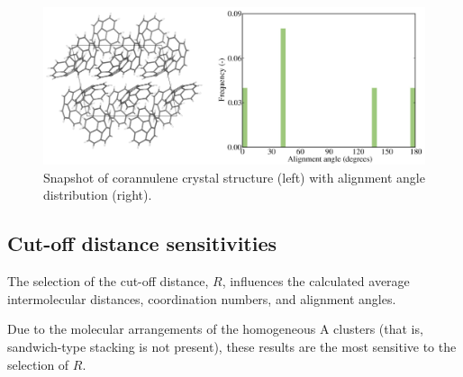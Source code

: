 %
\begin{figure}[!tbh]
\centering
\includegraphics[width=0.65\linewidth]{Figures/corannulene_crystal.eps}
\caption{Snapshot of corannulene crystal structure (left) with alignment angle distribution (right).}
\label{figSI:corannulene_crystal}
\end{figure}
%


\subsection{Cut-off distance sensitivities}
\label{secSI:cutoffs}
The selection of the cut-off distance, $R$, influences the calculated average intermolecular distances, coordination numbers, and alignment angles.

Due to the molecular arrangements of the homogeneous A clusters (that is, sandwich-type stacking is not present), these results are the most sensitive to the selection of $R$.


